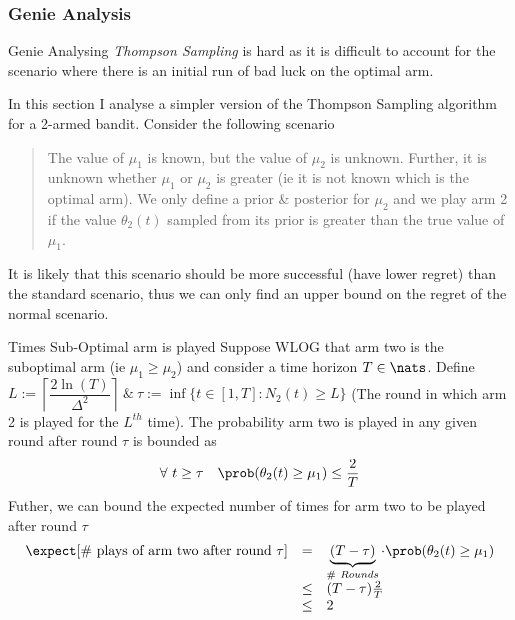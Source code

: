 \documentclass[11pt,a4paper]{article}
\begin{document}
\subsubsection{Genie Analysis}

  \begin{remark}{Genie}
    Analysing \textit{Thompson Sampling} is hard as it is difficult to account for the scenario where there is an initial run of bad luck on the optimal arm.
    \par In this section I analyse a simpler version of the Thompson Sampling algorithm for a 2-armed bandit. Consider the following scenario
    \begin{quote}
      The value of $\mu_1$ is known, but the value of $\mu_2$ is unknown. Further, it is unknown whether $\mu_1$ or $\mu_2$ is greater (ie it is not known which is the optimal arm). We only define a prior \& posterior for $\mu_2$ and we play arm 2 if the value $\theta_2(t)$ sampled from its prior is greater than the true value of $\mu_1$.
    \end{quote}
    \par It is likely that this scenario should be more successful (have lower regret)%
     than the standard scenario, thus we can only find an upper bound on the regret of the normal scenario.
  \end{remark}

  \begin{theorem}{Times Sub-Optimal arm is played}
    Suppose WLOG that arm two is the suboptimal arm (ie $\mu_1\geq\mu_2$) and consider a time horizon $T\in\nats$. Define $L:=\left\lceil\dfrac{2\ln(T)}{\Delta^2}\right\rceil\ \&\ \tau:=\inf\{t\in[1,T]:N_2(t)\geq L\}$ (The round in which arm 2 is played for the $L^{th}$ time). The probability arm two is played in any given round after round $\tau$ is bounded as
    \[ \forall\ t\geq\tau\quad\prob(\theta_2(t)\geq\mu_1)\leq\frac2T \]
    Futher, we can bound the expected number of times for arm two to be played after round $\tau$
    \[\begin{array}{rcl}
      \expect[\#\text{ plays of arm two after round }\tau]&=&\underbrace{(T-\tau)}_{\#\ Rounds}\cdot\prob(\theta_2(t)\geq\mu_1)\\
      &\leq&(T-\tau)\frac{2}T\\
      &\leq&2
    \end{array}\]
  \end{theorem}
\end{document}
